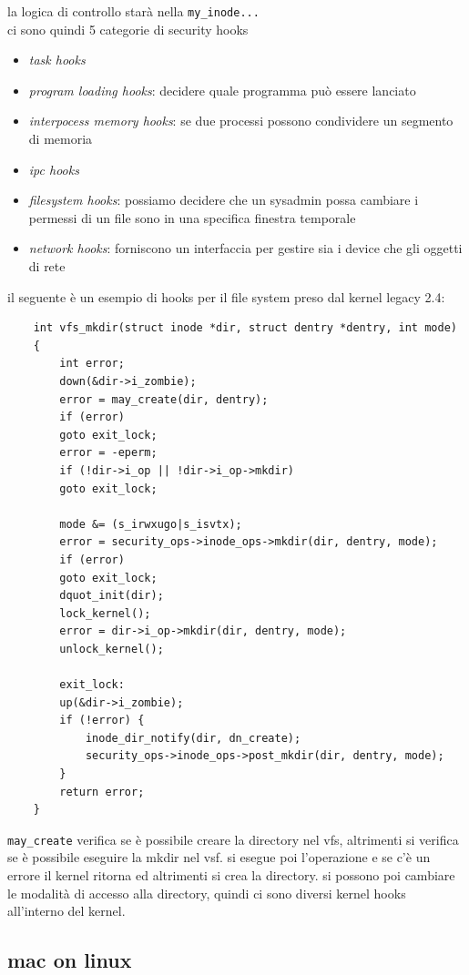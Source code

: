 \documentclass[12pt, oneside]{extbook} %
\begin{document}
la logica di controllo starà nella \texttt{my\_inode...}\\ci sono quindi 5 categorie di security hooks
\begin{itemize}
\item \textit{task hooks}
\item \textit{program loading hooks}: decidere quale programma può essere lanciato
\item \textit{interpocess memory hooks}: se due processi possono condividere un segmento di memoria
\item \textit{ipc hooks}
\item \textit{filesystem hooks}: possiamo decidere che un sysadmin possa cambiare i permessi di un file sono in una specifica finestra temporale
\item \textit{network hooks}: forniscono un interfaccia per gestire sia i device che gli oggetti di rete
\end{itemize}
il seguente è un esempio di hooks per il file system preso dal kernel legacy 2.4:
\begin{lstlisting}
	int vfs_mkdir(struct inode *dir, struct dentry *dentry, int mode)
	{
		int error;
		down(&dir->i_zombie);
		error = may_create(dir, dentry);
		if (error)
		goto exit_lock;
		error = -eperm;
		if (!dir->i_op || !dir->i_op->mkdir)
		goto exit_lock;
		
		mode &= (s_irwxugo|s_isvtx);
		error = security_ops->inode_ops->mkdir(dir, dentry, mode);
		if (error)
		goto exit_lock;
		dquot_init(dir);
		lock_kernel();
		error = dir->i_op->mkdir(dir, dentry, mode);
		unlock_kernel();
		
		exit_lock:
		up(&dir->i_zombie);
		if (!error) {
			inode_dir_notify(dir, dn_create);
			security_ops->inode_ops->post_mkdir(dir, dentry, mode);
		}
		return error;
	}
\end{lstlisting}
\texttt{may\_create} verifica se è possibile creare la directory nel vfs, altrimenti si verifica se è possibile eseguire la mkdir nel vsf. si esegue poi l'operazione e se c'è un errore il kernel ritorna ed altrimenti si crea la directory. si possono poi cambiare le modalità di accesso alla directory, quindi ci sono diversi kernel hooks all'interno del kernel.
\subsection{mac on linux}
\end{document}
